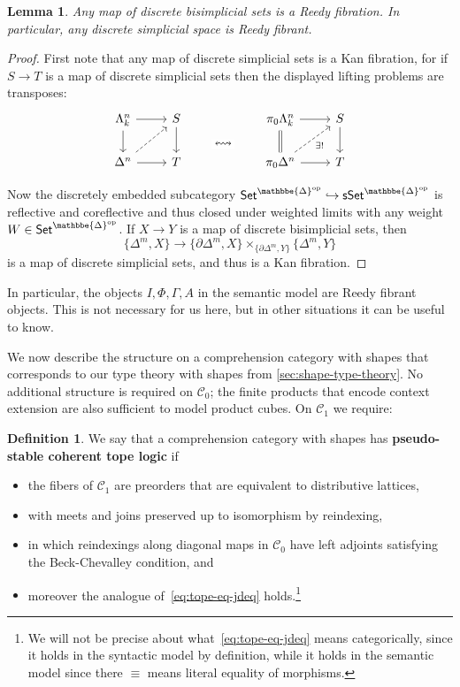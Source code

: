 \documentclass[12pt]{amsart}
\theoremstyle{plain}
\newtheorem{lem}[thm]{Lemma}
\theoremstyle{definition}
\newtheorem{defn}[thm]{Definition}
\theoremstyle{remark}
\numberwithin{equation}{section}
\newcommand{\jdeq}{\equiv}
\newcommand{\Set}{\mathsf{Set}}
\newcommand{\sSet}{\mathsf{sSet}}
\newcommand{\DDelta}{\mathbbe{\Delta}}
\newcommand{\op}{\mathrm{op}}
\newcommand{\C}{\mathcal{C}}
\begin{document}
\begin{lem}\label{lem:discrete-reedy} Any map of discrete bisimplicial sets is a Reedy fibration. In particular, any discrete simplicial space is Reedy fibrant.
\end{lem}
\begin{proof}
First note that any map of discrete simplicial sets is a Kan fibration, for if $S \to T$ is a map of discrete simplicial sets then the displayed lifting problems are transposes:
\[
\begin{tikzcd} \Lambda^n_k \arrow[r] \arrow[d] & S \arrow[d]  & \arrow[d, phantom, "{\leftrightsquigarrow}" description] & \pi_0 \Lambda^n_k \arrow[d, equals] \arrow[r] & S \arrow[d] \\ \Delta^n \arrow[ur, dashed] \arrow[r] & T & ~ & \pi_0 \Delta^n \arrow[r] \arrow[ur, dashed, "{\exists !}"'] & T
\end{tikzcd}
\]

Now the discretely embedded subcategory $\Set^{\DDelta^\op}\hookrightarrow \sSet^{\DDelta^\op}$ is reflective and coreflective and thus closed under weighted limits with any weight $W \in \Set^{\DDelta^\op}$. If $X \to Y$ is a map of discrete bisimplicial sets, then
\[ \{ \Delta^m,X\} \to \{\partial\Delta^m,X\} \times_{\{\partial\Delta^m,Y\}} \{\Delta^m , Y\}\] is a map of discrete simplicial sets, and thus is a Kan fibration.
\end{proof}

In particular, the objects $I,\Phi,\Gamma,A$ in the semantic model are Reedy fibrant objects.
This is not necessary for us here, but in other situations it can be useful to know.

We now describe the structure on a comprehension category with shapes that corresponds to our type theory with shapes from \cref{sec:shape-type-theory}.
No additional structure is required on $\C_0$; the finite products that encode context extension are also sufficient to model product cubes.
On $\C_1$ we require:

\begin{defn}\label{defn:cc-topelogic}
  We say that a comprehension category with shapes has \textbf{pseudo-stable coherent tope logic} if
  \begin{itemize}
  \item the fibers of $\C_1$ are preorders that are equivalent to distributive lattices, 
  \item with meets and joins preserved up to isomorphism by reindexing, 
  \item in which reindexings along diagonal maps in $\C_0$ have left adjoints satisfying the Beck-Chevalley condition, and 
  \item moreover the analogue of~\eqref{eq:tope-eq-jdeq} holds.\footnote{We will not be precise about what~\eqref{eq:tope-eq-jdeq} means categorically, since it holds in the syntactic model by definition, while it holds in the semantic model since there $\jdeq$ means literal equality of morphisms.}
  \end{itemize}
\end{defn}
\end{document}
